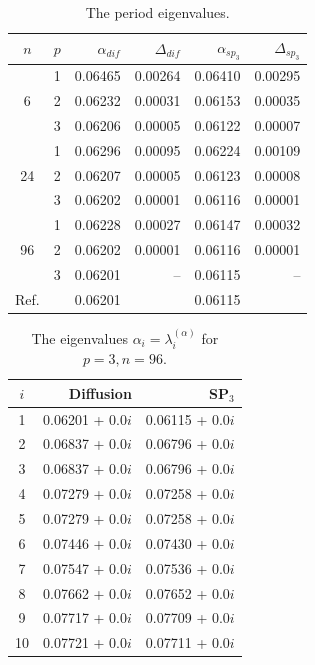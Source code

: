 \documentclass[authoryear]{elsarticle}
\begin{document}
\begin{table}[h]
\caption{The period eigenvalues.}
\label{tab:iaea_without_alpha_del}
\begin{center}
\begin{tabular}{c c r r r r}
\hline
$n$ & $p$ & $\alpha_{dif}$ & $\Delta_{dif}$ &$\alpha_{sp_3}$& $\Delta_{sp_3}$ \\
\hline
	& 1	&0.06465 &0.00264&0.06410 & 0.00295\\
6	& 2	&0.06232 &0.00031&0.06153 & 0.00035\\
	& 3	&0.06206 &0.00005&0.06122 & 0.00007\\ 
\hline
	& 1	&0.06296 &0.00095&0.06224 & 0.00109\\
24& 2	&0.06207 &0.00005&0.06123 & 0.00008\\
	& 3	&0.06202 &0.00001&0.06116 & 0.00001\\ 
\hline
	& 1	&0.06228 &0.00027&0.06147 & 0.00032\\
96& 2	&0.06202 &0.00001&0.06116 & 0.00001\\
	& 3	&0.06201 &     --&0.06115 &      --\\ 
\hline
Ref.& & 0.06201 & & 0.06115 \\ 
\hline
\end{tabular}
\end{center}
\end{table}

\begin{table}[h]
\caption{The eigenvalues $\alpha_i=\lambda_i^{(\alpha)}$ for $p=3, n=96$.}
\label{tab:iaea_without_alpha_del_10}
\begin{center}
\begin{tabular}{c r r}
\hline
$i$ & Diffusion & SP$_3$ \\
\hline
1& 0.06201 + 0.0$i$&0.06115 + 0.0$i$\\
2& 0.06837 + 0.0$i$&0.06796 + 0.0$i$\\
3& 0.06837 + 0.0$i$&0.06796 + 0.0$i$\\
4& 0.07279 + 0.0$i$&0.07258 + 0.0$i$\\
5& 0.07279 + 0.0$i$&0.07258 + 0.0$i$\\
6& 0.07446 + 0.0$i$&0.07430 + 0.0$i$\\
7& 0.07547 + 0.0$i$&0.07536 + 0.0$i$\\
8& 0.07662 + 0.0$i$&0.07652 + 0.0$i$\\
9& 0.07717 + 0.0$i$&0.07709 + 0.0$i$\\
10& 0.07721 + 0.0$i$&0.07711 + 0.0$i$\\
\hline
\end{tabular}
\end{center}
\end{table}
\end{document}
